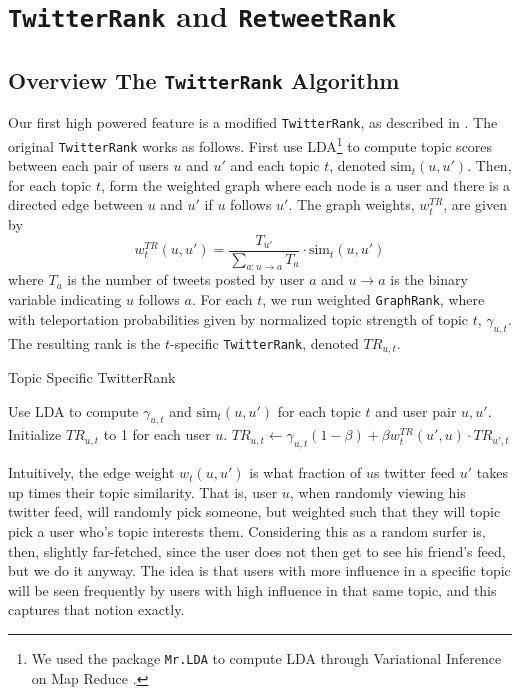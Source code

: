 \section{\texttt{TwitterRank} and \texttt{RetweetRank}}

\subsection{Overview The \texttt{TwitterRank} Algorithm}

Our first high powered feature is a modified \texttt{TwitterRank}, as described in \cite{Weng:2010:TFT:1718487.1718520}.
The original \texttt{TwitterRank} works as follows.  
First use LDA\footnote{We used the package \texttt{Mr.LDA} to compute LDA through Variational Inference on Map Reduce \cite{conf/www/ZhaiBAA12}.} to compute topic scores between each pair of users $u$ and $u'$ and each topic $t$, denoted $\mbox{sim}_t(u,u')$.
Then, for each topic $t$, form the weighted graph where each node is a user and there is a directed edge between $u$ and $u'$ if $u$ follows $u'$.
The graph weights, $w^{TR}_t$, are given by
\begin{equation}\label{eq:treq}
w^{TR}_t(u,u') = \frac{T_{u'}}{\sum_{a:u\to a}T_{a}}\cdot \mbox{sim}_t(u,u')
\end{equation}
where $T_{a}$ is the number of tweets posted by user $a$ and $u\to a$ is the binary variable indicating $u$ follows $a$.  
For each $t$, we run weighted \texttt{GraphRank}, where with teleportation probabilities given by normalized topic strength of topic $t$, $\gamma_{u,t}$.   
The resulting rank is the $t$-specific \texttt{TwitterRank}, denoted $TR_{u,t}$.  

\begin{algorithm}
  \caption{Topic Specific TwitterRank}
  \label{alg:tralg}

  \begin{algorithmic}
    \State Use LDA to compute $\gamma_{u,t}$ and $\mbox{sim}_t(u,u')$ for each topic $t$ and user pair $u,u'$.  
    \State Initialize $TR_{u,t}$ to 1 for each user $u$.
    \State $TR_{u,t}\gets \gamma_{u,t}(1-\beta) + \beta w^{TR}_t(u',u)\cdot TR_{u',t}$
    \EndFor
    \EndWhile
    \EndFor
  \end{algorithmic}
\end{algorithm}


Intuitively, the edge weight $w_t(u,u')$ is what fraction of $u$s twitter feed $u'$ takes up times their topic similarity.
That is, user $u$, when randomly viewing his twitter feed, will randomly pick someone, but weighted such that they will topic pick a user who's topic interests them.  
Considering this as a random surfer is, then, slightly far-fetched, since the user does not then get to see his friend's feed, but we do it anyway.  
The idea is that users with more influence in a specific topic will be seen frequently by users with high influence in that same topic, and this captures that notion exactly.

